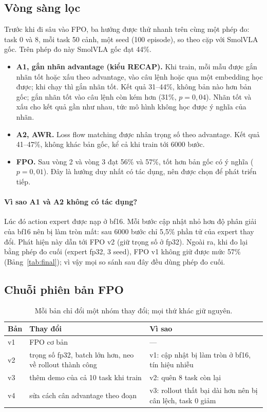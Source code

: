 \documentclass[10pt,a4paper]{article}
\begin{document}
\subsection{Vòng sàng lọc}\label{sec:screen}
Trước khi đi sâu vào FPO, ba hướng được thử nhanh trên cùng một phép đo: task 0 và 8, mỗi task 50 cảnh, một seed
(100 episode), so theo cặp với SmolVLA gốc. Trên phép đo này SmolVLA gốc đạt 44\%.
\begin{itemize}
\item \textbf{A1, gắn nhãn advantage (kiểu RECAP).} Khi train, mỗi mẫu được gắn nhãn tốt hoặc xấu theo advantage,
vào câu lệnh hoặc qua một embedding học được; khi chạy thì gắn nhãn tốt. Kết quả 31--44\%, không bản nào hơn
bản gốc; gắn nhãn tốt vào câu lệnh còn kém hơn (31\%, $p=0{,}04$). Nhãn tốt và xấu cho kết quả gần như nhau,
tức mô hình không học được ý nghĩa của nhãn.
\item \textbf{A2, AWR.} Loss flow matching được nhân trọng số theo advantage. Kết quả 41--47\%, không khác bản gốc, kể
cả khi train tới 6000 bước.
\item \textbf{FPO.} Sau vòng 2 và vòng 3 đạt 56\% và 57\%, tốt hơn bản gốc có ý nghĩa ($p=0{,}01$). Đây là hướng duy nhất
có tác dụng, nên được chọn để phát triển tiếp.
\end{itemize}
\paragraph{Vì sao A1 và A2 không có tác dụng?} Lúc đó action expert được nạp ở bf16. Mỗi bước cập nhật nhỏ hơn độ phân
giải của bf16 nên bị làm tròn mất: sau 6000 bước chỉ 5{,}5\% phần tử của expert thay đổi. Phát hiện này dẫn tới FPO v2
(giữ trọng số ở fp32). Ngoài ra, khi đo lại bằng phép đo cuối (expert fp32, 3 seed), FPO v1 không giữ được mức 57\%
(Bảng~\ref{tab:final}); vì vậy mọi so sánh sau đây đều dùng phép đo cuối.

\subsection{Chuỗi phiên bản FPO}
\begin{table}[H]
\centering\small
\begin{tabularx}{\linewidth}{@{}l X X@{}}
\toprule
Bản & Thay đổi & Vì sao \\
\midrule
v1 & FPO cơ bản & --- \\
v2 & trọng số fp32, batch lớn hơn, neo về rollout thành công & v1: cập nhật bị làm tròn ở bf16, tín hiệu nhiễu \\
v3 & thêm demo của cả 10 task khi train & v2: quên 8 task còn lại \\
v4 & sửa cách cân advantage theo đoạn & v3: rollout thất bại dài hơn nên bị cân lệch, task 0 giảm \\
\bottomrule
\end{tabularx}
\caption{Mỗi bản chỉ đổi một nhóm thay đổi; mọi thứ khác giữ nguyên.}
\label{tab:versions}
\end{table}
\end{document}
